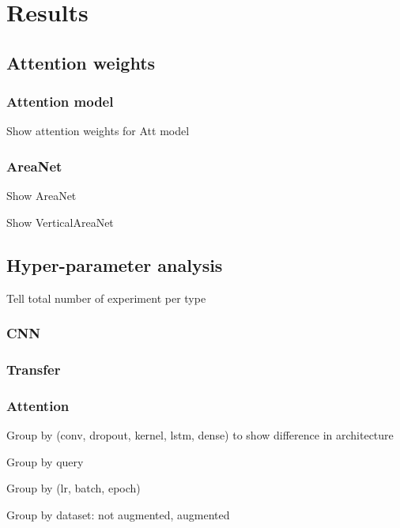 
\section{Results}
\label{sec:results}

\subsection{Attention weights}

\subsubsection{Attention model}

Show attention weights for Att model

\subsubsection{AreaNet}

Show AreaNet

Show VerticalAreaNet

\subsection{Hyper-parameter analysis}



Tell total number of experiment per type

\subsubsection{CNN}

\subsubsection{Transfer}

\subsubsection{Attention}

Group by (conv, dropout, kernel, lstm, dense) to show difference in architecture

Group by query

Group by (lr, batch, epoch)

Group by dataset: not augmented, augmented

